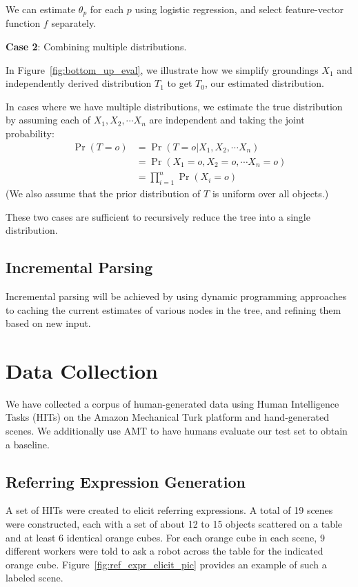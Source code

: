 \documentclass[letterpaper,10pt]{article}
\begin{document}
We can estimate $\theta_p$ for each $p$ using logistic regression, and select feature-vector function $f$ separately.

\textbf{Case 2}: Combining multiple distributions.

In Figure~\ref{fig:bottom_up_eval}, we illustrate how we simplify groundings $X_1$ and independently derived distribution $T_1$ to get $T_0$, our estimated distribution.

In cases where we have multiple distributions, we estimate the true distribution by assuming each of $X_1, X_2, \cdots X_n$ are independent and taking the joint probability:
\begin{align*}
\Pr(T = o) & = \Pr(T = o | X_1, X_2, \cdots X_n)
\\ & = \Pr(X_1 = o, X_2 = o, \cdots X_n = o)
\\ & = \prod_{i = 1}^n\Pr(X_i = o)
\end{align*}
(We also assume that the prior distribution of $T$ is uniform over all objects.)

These two cases are sufficient to recursively reduce the tree into a single distribution.

\subsection{Incremental Parsing}

Incremental parsing will be achieved by using dynamic programming approaches to caching the current estimates of various nodes in the tree, and refining them based on new input. 

\section{Data Collection} 
We have collected a corpus of human-generated data using Human Intelligence Tasks (HITs) on the Amazon Mechanical Turk platform and hand-generated scenes. We additionally use AMT to have humans evaluate our test set to obtain a baseline.

\subsection{Referring Expression Generation}
A set of HITs were created to elicit referring expressions. A total of 19 scenes were constructed, each with a set of about 12 to 15 objects scattered on a table and at least 6 identical orange cubes. For each orange cube in each scene, 9 different workers were told to ask a robot across the table for the indicated orange cube. Figure~\ref{fig:ref_expr_elicit_pic} provides an example of such a labeled scene.
\end{document}
